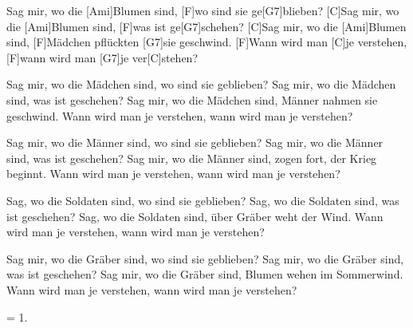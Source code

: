 
\sloka
[C]Sag mir, wo die [Ami]Blumen sind, [F]wo sind sie ge[G7]blieben?
[C]Sag mir, wo die [Ami]Blumen sind, [F]was ist ge[G7]schehen?
[C]Sag mir, wo die [Ami]Blumen sind, [F]Mädchen pflückten [G7]sie geschwind.
[F]Wann wird man [C]je verstehen, [F]wann wird man [G7]je ver[C]stehen?

\sloka
Sag mir, wo die Mädchen sind, wo sind sie geblieben?
Sag mir, wo die Mädchen sind, was ist geschehen?
Sag mir, wo die Mädchen sind, Männer nahmen sie geschwind.
Wann wird man je verstehen, wann wird man je verstehen?

\sloka
Sag mir, wo die Männer sind, wo sind sie geblieben?
Sag mir, wo die Männer sind, was ist geschehen?
Sag mir, wo die Männer sind, zogen fort, der Krieg beginnt.
Wann wird man je verstehen, wann wird man je verstehen?

\sloka
Sag, wo die Soldaten sind, wo sind sie geblieben?
Sag, wo die Soldaten sind, was ist geschehen?
Sag, wo die Soldaten sind, über Gräber weht der Wind.
Wann wird man je verstehen, wann wird man je verstehen?

\sloka
Sag mir, wo die Gräber sind, wo sind sie geblieben?
Sag mir, wo die Gräber sind, was ist geschehen?
Sag mir, wo die Gräber sind, Blumen wehen im Sommerwind.
Wann wird man je verstehen, wann wird man je verstehen?

\sloka
= 1.
